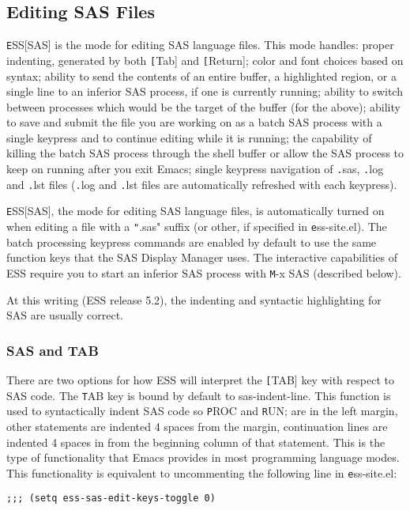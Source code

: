 \documentclass{article}
\begin{document}
\subsection{Editing SAS Files}
\label{sec:SAS:edit}

{\texttt ESS[SAS]} is the mode for editing SAS language files.  This mode
handles: proper indenting, generated by both {\texttt [Tab]} and {\texttt
  [Return]}; color and font choices based on syntax; ability to send
the contents of an entire buffer, a highlighted region, or a single
line to an inferior SAS process, if one is currently running; ability
to switch between processes which would be the target of the buffer
(for the above); ability to save and submit the file you are working
on as a batch SAS process with a single keypress and to continue
editing while it is running; the capability of killing the batch SAS
process through the shell buffer or allow the SAS process to keep on
running after you exit Emacs; single keypress navigation of {\texttt
  .sas}, {\texttt .log} and {\texttt .lst} files ({\texttt .log} and {\texttt .lst}
files are automatically refreshed with each keypress).

{\texttt ESS[SAS]}, the mode for editing SAS language files, is automatically
turned on when editing a file with a {\texttt ".sas"} suffix (or other, if
specified in {\texttt ess-site.el}).  The batch processing keypress commands are
enabled by default to use the same function keys that the SAS Display
Manager uses.  The interactive capabilities of ESS require you to
start an inferior SAS process with {\texttt M-x SAS} (described below).

At this writing (ESS release 5.2), the indenting and syntactic
highlighting for SAS are usually correct.


\subsubsection{SAS and TAB}
\label{sec:SAS:tab}

There are two options for how ESS will interpret the {\texttt [TAB]} key
with respect to SAS code.  The {\texttt TAB} key is bound by default to
sas-indent-line.  This function is used to syntactically indent SAS
code so {\texttt PROC} and {\texttt RUN;} are in the left margin, other
statements are indented 4 spaces from the margin, continuation lines
are indented 4 spaces in from the beginning column of that statement.
This is the type of functionality that Emacs provides in most
programming language modes.  This functionality is equivalent to
uncommenting the following line in {\texttt ess-site.el}:
\begin{verbatim}
;;; (setq ess-sas-edit-keys-toggle 0)
\end{verbatim}
\end{document}
